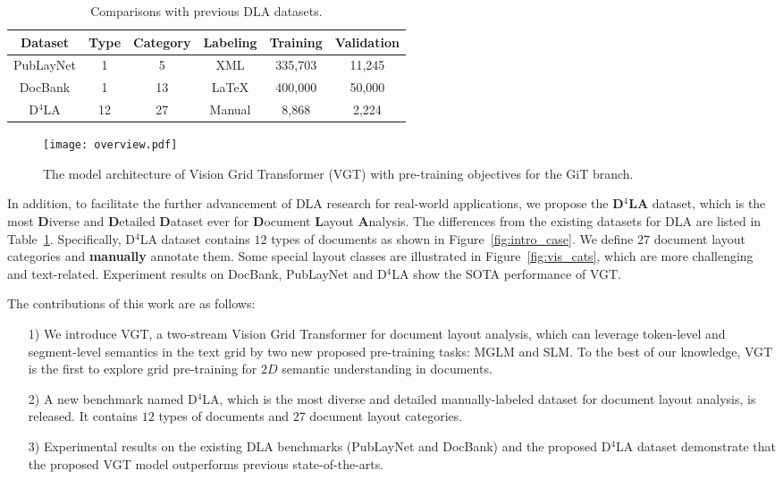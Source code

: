 \documentclass[10pt,twocolumn,letterpaper]{article}
\newcommand{\ra}[1]{\renewcommand{\arraystretch}{#1}}
\begin{document}
\begin{table}[t]\centering
\small
\setlength{\tabcolsep}{2pt}
\ra{1.2}
\caption{Comparisons with previous DLA datasets.}
\label{tab:datasets}
\begin{tabular}{cccccc}
\toprule[1pt]
\textbf{Dataset} & \textbf{Type} & \textbf{Category} & \textbf{Labeling} &\textbf{Training} & \textbf{Validation} \\
\midrule
PubLayNet &1 & 5	&XML &335,703	&11,245	 \\
DocBank & 1 & 13	&\LaTeX &400,000	&50,000 \\
D$^4$LA & 12 & 27	&Manual &8,868	&	2,224 \\
\bottomrule[1pt]
\end{tabular}
\end{table}

\begin{figure*}[!htp]\centering
\texttt{[image: overview.pdf]}
\caption{The model architecture of Vision Grid Transformer (VGT) with pre-training objectives for the GiT branch.}
 \label{fig:overview}
\end{figure*}


In addition, to facilitate the further advancement of DLA research for real-world applications, we propose the \textbf{D$^4$LA} dataset, which is the most \textbf{D}iverse and \textbf{D}etailed \textbf{D}ataset ever for \textbf{D}ocument \textbf{L}ayout \textbf{A}nalysis. 
The differences from the existing datasets for DLA are listed in Table~\ref{tab:datasets}.
Specifically, D$^4$LA dataset contains $12$ types of documents as shown in Figure~\ref{fig:intro_case}.
We define $27$ document layout categories and \textbf{manually} annotate them.
Some special layout classes are illustrated in Figure~\ref{fig:vis_cats}, which are more challenging and text-related.
Experiment results on DocBank, PubLayNet and D$^4$LA show the SOTA performance of VGT.

The contributions of this work are as follows:

\begin{itemize} \setlength{\itemsep}{0pt}
  \item[1)]  We introduce VGT, a two-stream Vision Grid Transformer for document layout analysis, which can leverage token-level and segment-level semantics in the text grid by two new proposed pre-training tasks: MGLM and SLM.
  To the best of our knowledge, VGT is the first to explore grid pre-training for $2D$ semantic understanding in documents.
  \item[2)]  A new benchmark named D$^4$LA, which is the most diverse and detailed manually-labeled dataset for document layout analysis, is released. It contains $12$ types of documents and $27$ document layout categories.
  \item[3)]  Experimental results on the existing DLA benchmarks (PubLayNet and DocBank) and the proposed D$^4$LA dataset demonstrate that the proposed VGT model outperforms previous state-of-the-arts.
\end{itemize}
\end{document}
